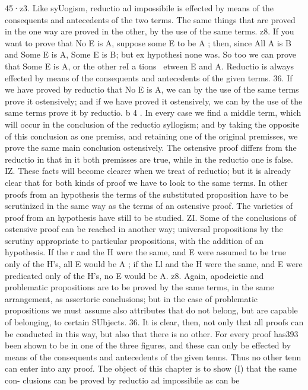 {{{{{{{{{{{{{{{{{{{{{{45·z3. Like syUogism, reductio ad impossibile is effected by
means of the consequents and antecedents of the two terms. The
same things that are proved in the one way are proved in the
other, by the use of the same terms.
z8. If you want to prove that No E is A, suppose some E to be
A ; then, since All A is B and Some E is A, Some E is B; but ex
hypothesi none was. So too we can prove that Some E is A, or the
other reI a tions ~etween E and A. Reductio is always effected by
means of the consequents and antecedents of the given terms.
36. If we have proved by reductio that No E is A, we can by
the use of the same terms prove it ostensively; and if we have
proved it ostensively, we can by the use of the same terms prove
it by reductio.
b 4 . In every case we find a middle term, which will occur in the
conclusion of the reductio syllogism; and by taking the opposite
of this conclusion as one premiss, and retaining one of the original
premisses, we prove the same main conclusion ostensively. The
ostensive proof differs from the reductio in that in it both premisses
are true, while in the reductio one is false.
IZ. These facts will become clearer when we treat of reductio;
but it is already clear that for both kinds of proof we have to look
to the same terms. In other proofs from an hypothesis the terms
of the substituted proposition have to be scrutinized in the same
way as the terms of an ostensive proof. The varieties of proof
from an hypothesis have still to be studied.
ZI. Some of the conclusions of ostensive proof can be reached in
another way; universal propositions by the scrutiny appropriate
to particular propositions, with the addition of an hypothesis. If
the r and the H were the same, and E were assumed to be true
only of the H's, all E would be A ; if the Ll and the H were the
same, and E were predicated only of the H's, no E would be A.
z8. Again, apodeictic and problematic propositions are to be
proved by the same terms, in the same arrangement, as assertoric
conclusions; but in the case of problematic propositions we must
assume also attributes that do not belong, but are capable of
belonging, to certain SUbjects.
36. It is clear, then, not only that all proofs can be conducted
in this way, but also that there is no other. For every proof has393
been shown to be in one of the three figures, and these can only
be effected by means of the consequents and antecedents of the
given tenns. Thus no other tenn can enter into any proof.
The object of this chapter is to show (I) that the same con-
clusions can be proved by reductio ad impossibile as can be
}}}}}}}}}}}}}}}}}}}}}}
